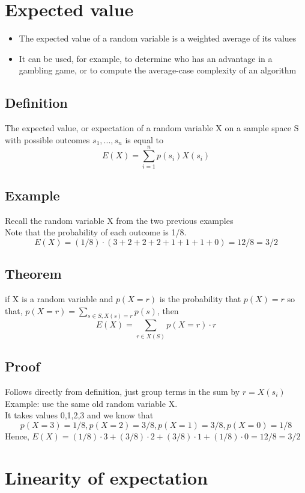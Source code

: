 \documentclass{article}[18pt]
\begin{document}
\section{Expected value}
\begin{itemize}
	\item The expected value of a random variable is a weighted average of its values
	\item It can be used, for example, to determine who has an advantage in a gambling game, or to compute the average-case complexity of an algorithm
\end{itemize}
\subsection{Definition}
The expected value, or expectation of a random variable X on a sample space S with possible outcomes $s_1,...,s_n$ is equal to
$$E ( X ) = \sum _ { i = 1 } ^ { n } p \left( s _ { i } \right) X \left( s _ { i } \right)$$
\subsection{Example}
Recall the random variable X from the two previous examples\\
Note that the probability of each outcome is 1/8.
$$E ( X ) = ( 1 / 8 ) \cdot ( 3 + 2 + 2 + 2 + 1 + 1 + 1 + 0 ) = 12 / 8 = 3 / 2$$
\subsection{Theorem}
if X is a random variable and $p(X=r)$ is the probability that $p(X)=r$ so that, $p ( X = r ) = \sum _ { s \in S , X ( s ) = r } p ( s )$, then
$$E ( X ) = \sum _ { r \in X ( S ) } p ( X = r ) \cdot r$$
\subsection{Proof}
Follows directly from definition, just group terms in the sum by $r=X(s_i)$\\
Example: use the same old random variable X.\\
It takes values 0,1,2,3 and we know that\\
$$p ( X = 3 ) = 1 / 8 , p ( X = 2 ) = 3 / 8 , p ( X = 1 ) = 3 / 8 , p ( X = 0 ) = 1 / 8$$
Hence, $E ( X ) = ( 1 / 8 ) \cdot 3 + ( 3 / 8 ) \cdot 2 + ( 3 / 8 ) \cdot 1 + ( 1 / 8 ) \cdot 0 = 12 / 8 = 3 / 2$
\section{Linearity of expectation}
\end{document}
